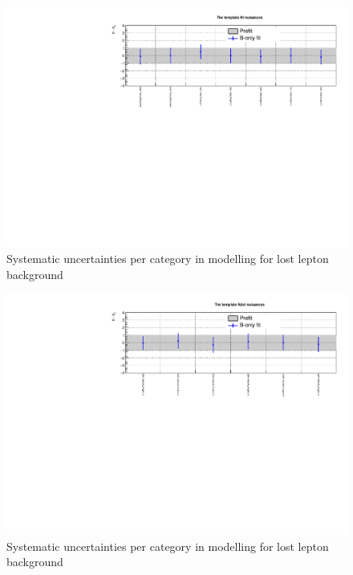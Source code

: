 \clearpage
\begin{figure}[h!]
  \centering
  \caption{Systematic uncertainties per \scalht category in \mht modelling for lost lepton background}
  \includegraphics[width=1.\linewidth]{figures/results/36invfb_approval/postfit/nuis/TemplateTtw_ht_nuisances}
\end{figure}

\begin{figure}[h!]
  \centering
  \caption{Systematic uncertainties per \njet category in \mht modelling for lost lepton background}
  \includegraphics[width=1.\linewidth]{figures/results/36invfb_approval/postfit/nuis/TemplateTtw_njet_nuisances}
\end{figure}

